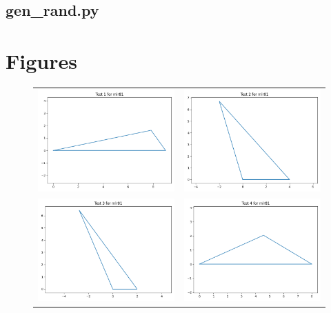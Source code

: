 \documentclass{article}
\begin{document}
\subsection{gen\_rand.py}


\clearpage %
\section{Figures}

\begin{figure}[ht!]
\begin{center}
\begin{tabular}{cc}
\includegraphics[width=3in]{TriPlotTest1.png} &
\includegraphics[width=3in]{TriPlotTest2.png} \\
\includegraphics[width=3in]{TriPlotTest3.png} &
\includegraphics[width=3in]{TriPlotTest4.png} \\

\end{tabular}
\end{center}
\end{figure}
\end{document}
